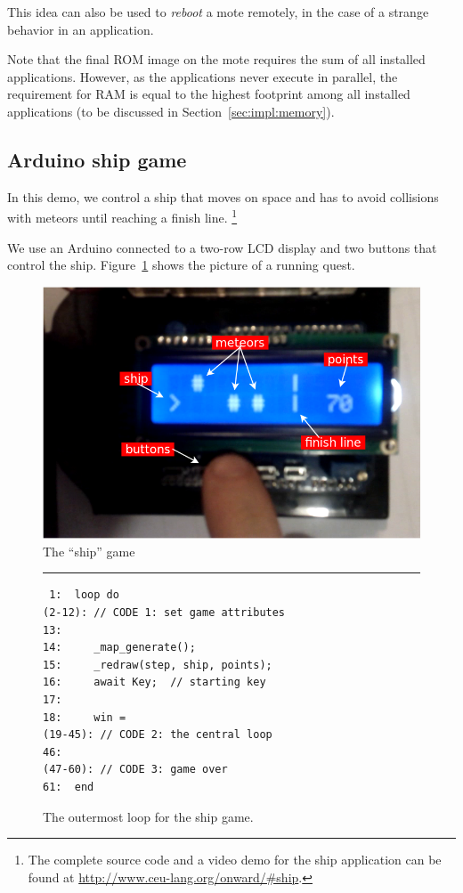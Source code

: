 \documentclass{sigplan-proc}
\newcommand{\2}{\;\;}
\newcommand{\5}{\;\;\;\;\;}
\begin{document}
This idea can also be used to \emph{reboot} a mote remotely, in the case of a 
strange behavior in an application.

Note that the final ROM image on the mote requires the sum of all installed 
applications.
However, as the applications never execute in parallel, the requirement for RAM 
is equal to the highest footprint among all installed applications (to be 
discussed in Section~\ref{sec:impl:memory}).

\subsection{Arduino ship game}

In this demo, we control a ship that moves on space and has to avoid collisions 
with meteors until reaching a finish line.%
\footnote{The complete source code and a video demo for the ship application 
can be found at \url{http://www.ceu-lang.org/onward/\#ship}.}

We use an Arduino connected to a two-row LCD display and two buttons that 
control the ship.
Figure~\ref{fig:ship} shows the picture of a running quest.

\begin{figure}[t]
\centering
\includegraphics[scale=0.33]{ship.png}
\caption{ The ``ship'' game
\label{fig:ship}
}
\end{figure}

\begin{figure}[t]
\rule{8.5cm}{0.37pt}
{\small
\begin{verbatim}
 1:  loop do
(2-12): // CODE 1: set game attributes
13:
14:     _map_generate();
15:     _redraw(step, ship, points);
16:     await Key;  // starting key
17:
18:     win =
(19-45): // CODE 2: the central loop
46:
(47-60): // CODE 3: game over
61:  end
\end{verbatim}
}
\caption{ The outermost loop for the ship game.
\label{lst:demos:ship:1}
}
\end{figure}
\end{document}
